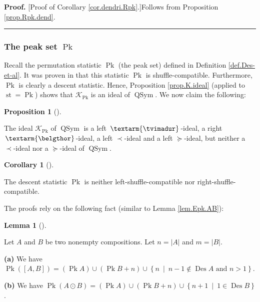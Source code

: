\documentclass[numbers=enddot,12pt,final,onecolumn,notitlepage]{scrartcl}%
\theoremstyle{definition}
\newtheorem{lem}[theo]{Lemma}
\newenvironment{lemma}[1][]
{\begin{lem}[#1]\begin{leftbar}}
{\end{leftbar}\end{lem}}
\newtheorem{prop}[theo]{Proposition}
\newenvironment{proposition}[1][]
{\begin{prop}[#1]\begin{leftbar}}
{\end{leftbar}\end{prop}}
\newtheorem{coro}[theo]{Corollary}
\newenvironment{corollary}[1][]
{\begin{coro}[#1]\begin{leftbar}}
{\end{leftbar}\end{coro}}
\newenvironment{proof}[1][Proof]{\noindent\textbf{#1.} }{\ \rule{0.5em}{0.5em}}
\newenvironment{verlong}{}{}
\newcommand{\tvi}{\left. \textarm{\tvimadur} \right.}
\newcommand{\bel}{\left. \textarm{\belgthor} \right.}
\begin{document}
\begin{verlong}
\begin{proof}
[Proof of Corollary \ref{cor.dendri.Rpk}.]Follows from Proposition
\ref{prop.Rpk.dend}.
\end{proof}

\subsubsection{The peak set $\operatorname*{Pk}$}

Recall the permutation statistic $\operatorname*{Pk}$ (the peak set) defined
in Definition \ref{def.Des-et-al}. It was proven in \cite[Theorem 4.7
\textbf{(a)}]{part1} that this statistic $\operatorname*{Pk}$ is
shuffle-compatible. Furthermore, $\operatorname*{Pk}$ is clearly a descent
statistic. Hence, Proposition \ref{prop.K.ideal} (applied to
$\operatorname{st}=\operatorname*{Pk}$) shows that $\mathcal{K}%
_{\operatorname*{Pk}}$ is an ideal of $\operatorname*{QSym}$. We now claim the following:

\begin{proposition}
\label{prop.Pk.dend}The ideal $\mathcal{K}_{\operatorname*{Pk}}$ of
$\operatorname*{QSym}$ is a left $\tvi$-ideal, a right $\bel$-ideal, a left
$\left.  \prec\right.  $-ideal and a left $\left.  \succeq\right.  $-ideal,
but neither a $\left.  \prec\right.  $-ideal nor a $\left.  \succeq\right.
$-ideal of $\operatorname*{QSym}$.
\end{proposition}

\begin{corollary}
\label{cor.dendri.Pk}The descent statistic $\operatorname*{Pk}$ is neither
left-shuffle-compatible nor right-shuffle-compatible.
\end{corollary}

The proofs rely on the following fact (similar to Lemma \ref{lem.Epk.AB}):

\begin{lemma}
\label{lem.Pk.AB}Let $A$ and $B$ be two nonempty compositions. Let
$n=\left\vert A\right\vert $ and $m=\left\vert B\right\vert $.

\textbf{(a)} We have $\operatorname*{Pk}\left(  \left[  A,B\right]  \right)
=\left(  \operatorname*{Pk}A\right)  \cup\left(  \operatorname*{Pk}B+n\right)
\cup\left\{  n\ \mid\ n-1\notin\operatorname{Des}A\text{ and }n>1\right\}  $.

\textbf{(b)} We have $\operatorname*{Pk}\left(  A\odot B\right)  =\left(
\operatorname*{Pk}A\right)  \cup\left(  \operatorname*{Pk}B+n\right)
\cup\left\{  n+1\ \mid\ 1\in\operatorname{Des}B\right\}  $.
\end{lemma}


\end{verlong}
\end{document}
